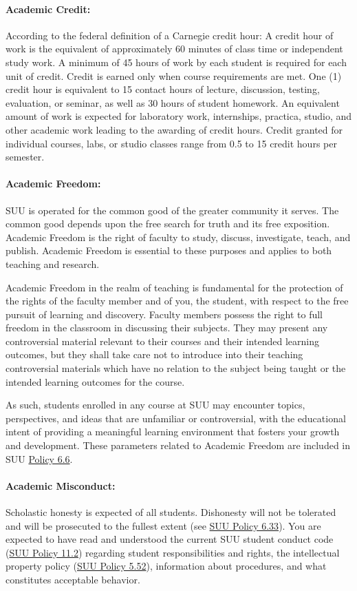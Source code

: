 \documentclass[12pt, letterpaper]{article}
\begin{document}
\paragraph{Academic Credit:}
According to the federal definition of a Carnegie credit hour: A credit hour of work is the equivalent of approximately 60 minutes of class time or independent study work. A minimum of 45 hours of work by each student is required for each unit of credit. Credit is earned only when course requirements are met. One (1) credit hour is equivalent to 15 contact hours of lecture, discussion, testing, evaluation, or seminar, as well as 30 hours of student homework. An equivalent amount of work is expected for laboratory work, internships, practica, studio, and other academic work leading to the awarding of credit hours. Credit granted for individual courses, labs, or studio classes range from 0.5 to 15 credit hours per semester.

\paragraph{Academic Freedom:}
SUU is operated for the common good of the greater community it serves. The common good depends upon the free search for truth and its free exposition. Academic Freedom is the right of faculty to study, discuss, investigate, teach, and publish. Academic Freedom is essential to these purposes and applies to both teaching and research. 

\noindent
Academic Freedom in the realm of teaching is fundamental for the protection of the rights of the faculty member and of you, the student, with respect to the free pursuit of learning and discovery. Faculty members possess the right to full freedom in the classroom in discussing their subjects. They may present any controversial material relevant to their courses and their intended learning outcomes, but they shall take care not to introduce into their teaching controversial materials which have no relation to the subject being taught or the intended learning outcomes for the course.

\noindent
As such, students enrolled in any course at SUU may encounter topics, perspectives, and ideas that are unfamiliar or controversial, with the educational intent of providing a meaningful learning environment that fosters your growth and development. These parameters related to Academic Freedom are included in SUU \href{https://www.suu.edu/policies/06/06.html}{Policy 6.6}.

\paragraph{Academic Misconduct:}
Scholastic honesty is expected of all students. Dishonesty will not be tolerated and will be prosecuted to the fullest extent (see \href{https://www.suu.edu/policies/06/33.html}{SUU Policy 6.33}). You are expected to have read and understood the current SUU student conduct code (\href{https://www.suu.edu/policies/11/02.html}{SUU Policy 11.2}) regarding student responsibilities and rights, the intellectual property policy (\href{https://www.suu.edu/policies/05/52.html}{SUU Policy 5.52}), information about procedures, and what constitutes acceptable behavior. 
\end{document}
